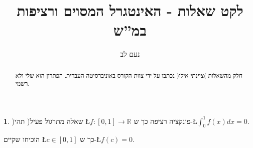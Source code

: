 \documentclass[english,hebrew]{article}
\theoremstyle{plain}
\theoremstyle{definition}
\newtheorem{xca}[thm]{\protect\exercisename}
\theoremstyle{definition}
\providecommand{\exercisename}{תרגיל}
\begin{document}
\title{לקט שאלות - האינטגרל המסוים ורציפות במ\textquotedblright ש}
\author{נעם לב}
\maketitle
\begin{abstract}
חלק מהשאלות )ציינתי אילו( נכתבו על ידי צוות הקורס באוניברסיטה העברית.
הפתרון הוא שלי ולא רשמי.
\end{abstract}
\medskip{}

\newpage{}
\begin{xca}
)שאלה מתרגול פעיל( תהי \L{$f:[0,1]\to\mathbb{R}$} פונקציה רציפה כך
ש-\L{$\int_{0}^{1}f(x)dx=0$}. 

הוכיחו שקיים \L{$c\in[0,1]$} כך ש-\L{$f(c)=0$}. 
\end{xca}
\end{document}
